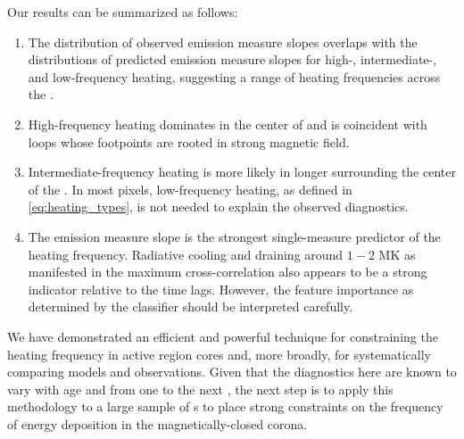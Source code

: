 Our results can be summarized as follows:
\begin{enumerate}
    \item The distribution of observed emission measure slopes overlaps with the distributions of predicted emission measure slopes for high-, intermediate-, and low-frequency heating, suggesting a range of heating frequencies across the \AR{}.
    \item High-frequency heating dominates in the center of \AR{} and is coincident with loops whose footpoints are rooted in strong magnetic field.
    \item Intermediate-frequency heating is more likely in longer  surrounding the center of the \AR{}. In most pixels, low-frequency heating, as defined in \autoref{eq:heating_types}, is not needed to explain the observed diagnostics.
    \item The emission measure slope is the strongest single-measure predictor of the heating frequency. Radiative cooling and draining around $1-2$ MK as manifested in the maximum cross-correlation also appears to be a strong indicator relative to the time lags. However, the feature importance as determined by the classifier should be interpreted carefully.
\end{enumerate}

We have demonstrated an efficient and powerful technique for constraining the heating frequency in active region cores and, more broadly, for systematically comparing models and observations.
Given that the diagnostics here are known to vary with age \citep[e.g.][]{schmelz_cold_2012,del_zanna_evolution_2015} and from one \AR{} to the next \citep{warren_systematic_2012,viall_survey_2017}, the next step is to apply this methodology to a large sample of \AR s to place strong constraints on the frequency of energy deposition in the magnetically-closed corona.
